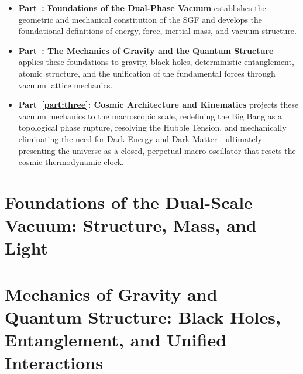\documentclass[11pt, letterpaper]{report}
\begin{document}
\begin{itemize}

\item \textbf{Part~\ref{part:one}: Foundations of the Dual-Phase Vacuum} establishes the geometric and mechanical constitution of the SGF and develops the foundational definitions of energy, force, inertial mass, and vacuum structure.

\item \textbf{Part~\ref{part:two}: The Mechanics of Gravity and the Quantum Structure} applies these foundations to gravity, black holes, deterministic entanglement, atomic structure, and the unification of the fundamental forces through vacuum lattice mechanics.

\item \textbf{Part~\ref{part:three}: Cosmic Architecture and Kinematics} projects these vacuum mechanics to the macroscopic scale, redefining the Big Bang as a topological phase rupture, resolving the Hubble Tension, and mechanically eliminating the need for Dark Energy and Dark Matter---ultimately presenting the universe as a closed, perpetual macro-oscillator that resets the cosmic thermodynamic clock.

\end{itemize}


\part{Foundations of the Dual-Scale Vacuum: Structure, Mass, and Light}
\label{part:one}



\part{Mechanics of Gravity and Quantum Structure: Black Holes, Entanglement, and Unified Interactions}
\label{part:two}











\end{document}
